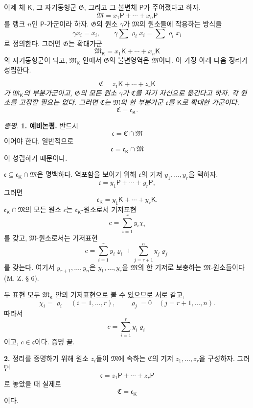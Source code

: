 이제 체 \(\mathsf K\), 그 자기동형군 \(\mathfrak G\), 그리고 그 불변체 \(\mathsf P\)가 주어졌다고 하자.
\[
        \mathfrak M
        =x_1\mathsf P+\cdots+x_n\mathsf P
\]
를 랭크 \(n\)인 \(\mathsf P\)-가군이라 하자. \(\mathfrak G\)의 원소 \(\gamma\)가 \(\mathfrak M\)의 원소들에 작용하는 방식을
\[
        \gamma x_i=x_i,
        \qquad
        \gamma\sum\varrho_i x_i=\sum\varrho_i x_i
\]
로 정의한다. 그러면 \(\mathfrak G\)는 확대가군
\[
        \mathfrak M_{\mathsf K}
        =x_1\mathsf K+\cdots+x_n\mathsf K
\]
의 자기동형군이 되고, \(\mathfrak M_{\mathsf K}\) 안에서 \(\mathfrak G\)의 불변영역은 \(\mathfrak M\)이다. 이 가정 아래 다음 정리가 성립한다.

\begingroup\itshape
\[
        \mathfrak C
        =z_1\mathsf K+\cdots+z_r\mathsf K
\]
가 \(\mathfrak M_{\mathsf K}\)의 부분가군이고, \(\mathfrak G\)의 모든 원소 \(\gamma\)가 \(\mathfrak C\)를 자기 자신으로 옮긴다고 하자. 각 원소를 고정할 필요는 없다. 그러면 \(\mathfrak C\)는 \(\mathfrak M\)의 한 부분가군 \(\mathfrak c\)를 \(\mathsf K\)로 확대한 가군이다.
\[
        \mathfrak C=\mathfrak c_{\mathsf K}.
\]
\endgroup

\emph{증명.} \textbf{1. 예비논평.} 반드시
\[
        \mathfrak c=\mathfrak C\cap\mathfrak M
\]
이어야 한다. 일반적으로
\[
        \mathfrak c
        =\mathfrak c_{\mathsf K}\cap\mathfrak M
\]
이 성립하기 때문이다.

\(\mathfrak c\subseteq\mathfrak c_{\mathsf K}\cap\mathfrak M\)은 명백하다. 역포함을 보이기 위해 \(\mathfrak c\)의 기저 \(y_1,\ldots,y_r\)을 택하자.
\[
        \mathfrak c
        =y_1\mathsf P+\cdots+y_r\mathsf P,
\]
그러면
\[
        \mathfrak c_{\mathsf K}
        =y_1\mathsf K+\cdots+y_r\mathsf K.
\]
\(\mathfrak c_{\mathsf K}\cap\mathfrak M\)의 모든 원소 \(c\)는 \(\mathfrak c_{\mathsf K}\)-원소로서 기저표현
\[
        c=\sum_{i=1}^{r}y_i\chi_i
\]
를 갖고, \(\mathfrak M\)-원소로서는 기저표현
\[
        c=\sum_{i=1}^{r}y_i\varrho_i
          +\sum_{j=r+1}^{n}y_j\varrho_j
\]
를 갖는다. 여기서 \(y_{r+1},\ldots,y_n\)은 \(y_1,\ldots,y_r\)을 \(\mathfrak M\)의 한 기저로 보충하는 \(\mathfrak M\)-원소들이다(M. Z. § 6).

두 표현 모두 \(\mathfrak M_{\mathsf K}\) 안의 기저표현으로 볼 수 있으므로 서로 같고,
\[
        \chi_i=\varrho_i\quad(i=1,\ldots,r),
        \qquad
        \varrho_j=0\quad(j=r+1,\ldots,n).
\]
따라서
\[
        c=\sum_{i=1}^{r}y_i\varrho_i
\]
이고, \(c\in\mathfrak c\)이다. 증명 끝.

\textbf{2.} 정리를 증명하기 위해 원소 \(z_i\)들이 \(\mathfrak M\)에 속하는 \(\mathfrak C\)의 기저 \(z_1,\ldots,z_r\)을 구성하자. 그러면
\[
        \mathfrak c
        =z_1\mathsf P+\cdots+z_r\mathsf P
\]
로 놓았을 때 실제로
\[
        \mathfrak C=\mathfrak c_{\mathsf K}
\]
이다.

